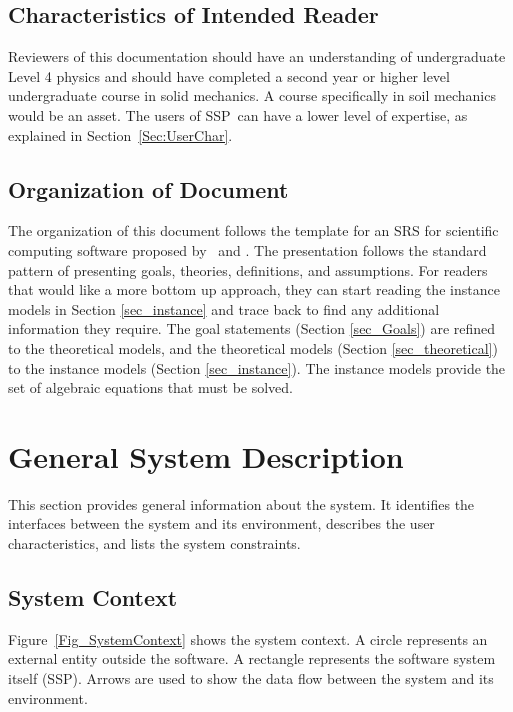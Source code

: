 \documentclass[12pt]{article}
\newcommand{\progname}{SSP}
\begin{document}
\subsection{Characteristics of Intended Reader}
\label{Sec:CharofInteRead}
Reviewers of this documentation should have an understanding of undergraduate 
Level 4 physics and should have completed a second year or higher level 
undergraduate course in solid mechanics. A course specifically in soil 
mechanics would be an asset. The users of \progname\ can have a 
lower level of expertise, as explained in Section~\ref{Sec:UserChar}.

\subsection{Organization of Document}

The organization of this document follows the template for an SRS for
scientific computing software proposed by~\cite{Koothoor2013} and
\cite{SmithAndLai2005}.  The presentation follows the standard pattern
of presenting goals, theories, definitions, and assumptions.  For
readers that would like a more bottom up approach, they can start
reading the instance models in Section \ref{sec_instance} and trace
back to find any additional information they require. The goal statements 
(Section \ref{sec_Goals}) are refined to the theoretical models, and the 
theoretical models (Section \ref{sec_theoretical}) to the instance models 
(Section \ref{sec_instance}). The instance models provide the set of algebraic 
equations that must be solved.


\section{General System Description}

This section provides general information about the system. It identifies the 
interfaces between the system and its environment, describes the user 
characteristics, and lists the system constraints.

\subsection{System Context}

Figure~\ref{Fig_SystemContext} shows the system context.  A circle represents an
external entity outside the software.  A rectangle represents the software 
system itself (\progname).  Arrows are used to show the data flow between the 
system and its environment.
\end{document}
